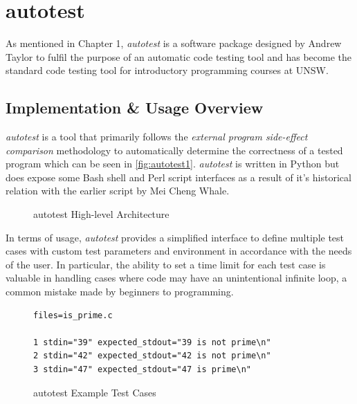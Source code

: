 \documentclass[hidelinks]{report}
\begin{document}
\section{autotest}

As mentioned in Chapter 1, \textit{autotest} is a software package designed by Andrew Taylor to fulfil the purpose of an automatic code testing tool and has become the standard code testing tool for introductory programming courses at UNSW.

\subsection{Implementation \& Usage Overview}

\textit{autotest} is a tool that primarily follows the \textit{external program side-effect comparison} methodology to automatically determine the correctness of a tested program which can be seen in \autoref{fig:autotest1}. \textit{autotest} is written in Python but does expose some Bash shell and Perl script interfaces as a result of it's historical relation with the earlier script by Mei Cheng Whale.

\begin{figure}[h]
	\centering
	\caption{autotest High-level Architecture}
	\label{fig:autotest1}
\end{figure}

In terms of usage, \textit{autotest} provides a simplified interface to define multiple test cases with custom test parameters and environment in accordance with the needs of the user. In particular, the ability to set a time limit for each test case is valuable in handling cases where code may have an unintentional infinite loop, a common mistake made by beginners to programming.

\begin{figure}[h]
	\centering
	\begin{lstlisting}[linewidth=\linewidth]
files=is_prime.c
		
1 stdin="39" expected_stdout="39 is not prime\n"
2 stdin="42" expected_stdout="42 is not prime\n"
3 stdin="47" expected_stdout="47 is prime\n"
	\end{lstlisting}
	\caption{autotest Example Test Cases}
	\label{fig:autotest2}
\end{figure}
\end{document}
